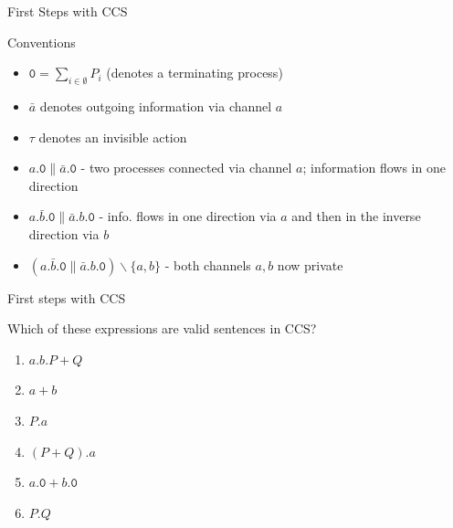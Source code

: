 \documentclass{beamer}
\begin{document}
\begin{frame}{First Steps with CCS}
        \begin{block}{Conventions}
                 \begin{itemize}
                  \item $\mathtt{0} = \sum_{i \in \emptyset} P_i$ 
                          (denotes a terminating process)
                  \item $\bar{a}$ denotes outgoing information via channel $a$ 
                  \item $\tau$ denotes an invisible action
                  \end{itemize}
        \end{block}
  
        \begin{examples}
          \begin{itemize}
                \item $a . \mathtt{0} \parallel \bar{a} . \mathtt{0}$ - two processes
                        connected via channel $a$; information flows in one direction
                \item $a . \bar{b} . \mathtt{0} \parallel \bar{a} . b . \mathtt{0}$ -
                        info. flows in one direction via $a$ and then in the inverse
                        direction via $b$ 
                \item $(a . \bar{b} . \mathtt{0} \parallel \bar{a} . b . \mathtt{0})
                  \backslash \{a,b\}$ - both channels $a,b$ now private
          \end{itemize}
        \end{examples}
\end{frame}

\begin{frame}{First steps with CCS}

  Which of these expressions are valid sentences in CCS?

  \begin{enumerate}
  \item $a . b . P + Q$
  \item $a + b$
  \item $P . a$
  \item $(P + Q). a$
  \item $a . \mathtt{0} + b . \mathtt{0}$
  \item $P . Q$
  \end{enumerate}
\end{frame}
\end{document}
